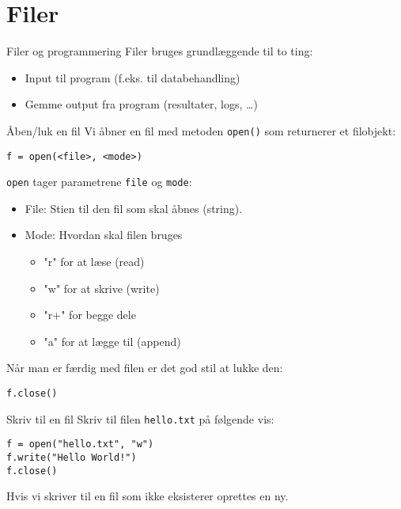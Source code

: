 \section{Filer}

\begin{frame}{Filer og programmering}
	Filer bruges grundlæggende til to ting:
	\begin{itemize}
		\item Input til program (f.eks. til databehandling)
		\item Gemme output fra program (resultater, logs, \ldots)
	\end{itemize}
\end{frame}

\begin{frame}[fragile]{Åben/luk en fil}
	Vi åbner en fil med metoden \texttt{open()} som returnerer et filobjekt:
	\begin{lstlisting}[style=python]
f = open(<file>, <mode>)
	\end{lstlisting}
	
	\pause
	\texttt{open} tager parametrene \texttt{file} og \texttt{mode}:
	\begin{itemize}
		\item File: Stien til den fil som skal åbnes (string).
		\item Mode: Hvordan skal filen bruges 
		\begin{itemize}
			\item "r" for at læse (read)
			\item "w" for at skrive (write)
			\item "r+" for begge dele
			\item "a" for at lægge til (append)
		\end{itemize}
	\end{itemize}

\pause
	Når man er færdig med filen er det god stil at lukke den:
	\begin{lstlisting}[style=python]
f.close()
	\end{lstlisting}
\end{frame}


\begin{frame}[fragile]{Skriv til en fil}
Skriv til filen \texttt{hello.txt} på følgende vis:

\begin{lstlisting}[style=python]
f = open("hello.txt", "w")
f.write("Hello World!")
f.close()
\end{lstlisting}

Hvis vi skriver til en fil som ikke eksisterer oprettes en ny.

\end{frame}

